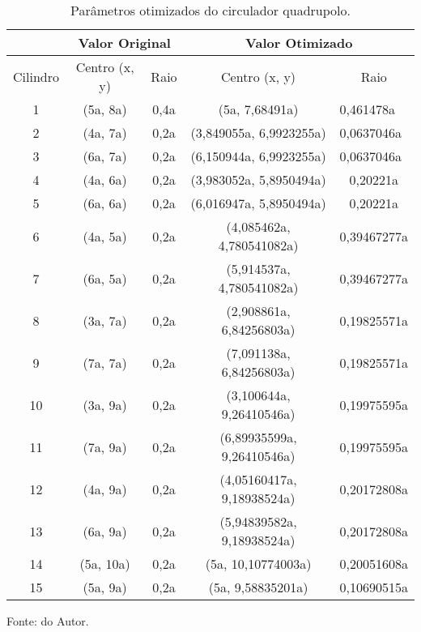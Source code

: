 



\begin{table}[H]
    \centering
    \caption{Parâmetros otimizados do circulador quadrupolo.}
\begin{tabular}{ccccc}
\hline
         & \multicolumn{2}{c}{Valor Original} & \multicolumn{2}{c}{Valor Otimizado}                         \\ \hline
Cilindro & Centro (x, y)        & Raio        & Centro (x, y)              & Raio                           \\ \hline
1        & (5a, 8a)             & 0,4a        & (5a, 7,68491a)             & \multicolumn{1}{l}{0,461478a}  \\
2        & (4a, 7a)             & 0,2a        & (3,849055a, 6,9923255a)    & \multicolumn{1}{l}{0,0637046a} \\
3        & (6a, 7a)             & 0,2a        & (6,150944a, 6,9923255a)    & \multicolumn{1}{l}{0,0637046a} \\
4        & (4a, 6a)             & 0,2a        & (3,983052a, 5,8950494a)    & 0,20221a                       \\
5        & (6a, 6a)             & 0,2a        & (6,016947a, 5,8950494a)    & 0,20221a                       \\
6        & (4a, 5a)             & 0,2a        & (4,085462a, 4,780541082a)  & 0,39467277a                    \\
7        & (6a, 5a)             & 0,2a        & (5,914537a, 4,780541082a)  & 0,39467277a                    \\
8        & (3a, 7a)             & 0,2a        & (2,908861a, 6,84256803a)   & 0,19825571a                    \\
9        & (7a, 7a)             & 0,2a        & (7,091138a, 6,84256803a)   & 0,19825571a                    \\
10       & (3a, 9a)             & 0,2a        & (3,100644a, 9,26410546a)   & 0,19975595a                    \\
11       & (7a, 9a)             & 0,2a        & (6,89935599a, 9,26410546a) & 0,19975595a                    \\
12       & (4a, 9a)             & 0,2a        & (4,05160417a, 9,18938524a) & 0,20172808a                    \\
13       & (6a, 9a)             & 0,2a        & (5,94839582a, 9,18938524a) & 0,20172808a                    \\
14       & (5a, 10a)            & 0,2a        & (5a, 10,10774003a)         & 0,20051608a                    \\
15       & (5a, 9a)             & 0,2a        & (5a, 9,58835201a)          & 0,10690515a                    \\ \hline
\end{tabular}

    \label{tab: QuadrupoloOtimizado}

    \vspace{2.5mm}
    Fonte: do Autor.

\end{table}